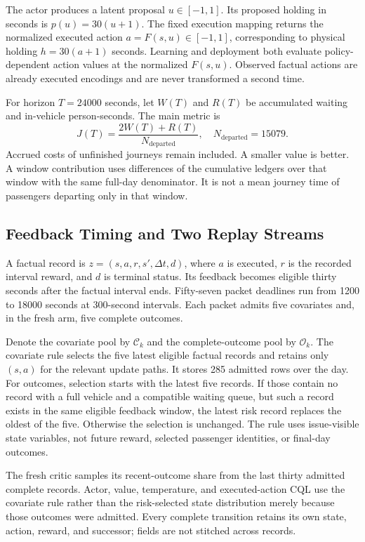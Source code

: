 \documentclass[journal]{IEEEtran}
\begin{document}
The actor produces a latent proposal $u\in[-1,1]$. Its proposed holding in seconds is $p(u)=30(u+1)$. The fixed execution mapping returns the normalized executed action $a=F(s,u)\in[-1,1]$, corresponding to physical holding $h=30(a+1)$ seconds. Learning and deployment both evaluate policy-dependent action values at the normalized $F(s,u)$. Observed factual actions are already executed encodings and are never transformed a second time.

For horizon $T=24000$ seconds, let $W(T)$ and $R(T)$ be accumulated waiting and in-vehicle person-seconds. The main metric is
\begin{equation}
 J(T)=\frac{2W(T)+R(T)}{N_{\mathrm{departed}}},\quad
 N_{\mathrm{departed}}=15079. \label{eq:cost}
\end{equation}
Accrued costs of unfinished journeys remain included. A smaller value is better. A window contribution uses differences of the cumulative ledgers over that window with the same full-day denominator. It is not a mean journey time of passengers departing only in that window.

\subsection{Feedback Timing and Two Replay Streams}
A factual record is $z=(s,a,r,s',\Delta t,d)$, where $a$ is executed, $r$ is the recorded interval reward, and $d$ is terminal status. Its feedback becomes eligible thirty seconds after the factual interval ends. Fifty-seven packet deadlines run from 1200 to 18000 seconds at 300-second intervals. Each packet admits five covariates and, in the fresh arm, five complete outcomes.

Denote the covariate pool by $\mathcal C_k$ and the complete-outcome pool by $\mathcal O_k$. The covariate rule selects the five latest eligible factual records and retains only $(s,a)$ for the relevant update paths. It stores 285 admitted rows over the day. For outcomes, selection starts with the latest five records. If those contain no record with a full vehicle and a compatible waiting queue, but such a record exists in the same eligible feedback window, the latest risk record replaces the oldest of the five. Otherwise the selection is unchanged. The rule uses issue-visible state variables, not future reward, selected passenger identities, or final-day outcomes.

The fresh critic samples its recent-outcome share from the last thirty admitted complete records. Actor, value, temperature, and executed-action CQL use the covariate rule rather than the risk-selected state distribution merely because those outcomes were admitted. Every complete transition retains its own state, action, reward, and successor; fields are not stitched across records.
\end{document}
